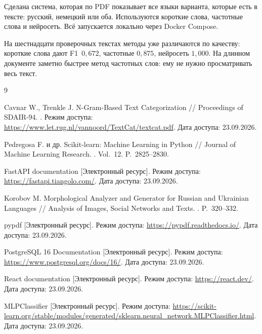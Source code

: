 
Сделана система, которая по PDF показывает все языки варианта, которые есть в тексте: русский, немецкий или оба. Используются короткие слова, частотные слова и нейросеть. Всё запускается локально через Docker Compose.

На шестнадцати проверочных текстах методы уже различаются по качеству: короткие слова дают F1~$0{,}672$, частотные \mdash $0{,}875$, нейросеть \mdash $1{,}000$. На длинном документе заметно быстрее метод частотных слов: ему не нужно просматривать весь текст.

\begin{thebibliography}{9}

	Cavnar W., Trenkle J. N-Gram-Based Text Categorization // Proceedings of SDAIR-94. . \mdash Режим доступа: \url{https://www.let.rug.nl/vannoord/TextCat/textcat.pdf}. \mdash Дата доступа: 23.09.2026.

	Pedregosa F. и др. Scikit-learn: Machine Learning in Python // Journal of Machine Learning Research. . \mdash Vol.~12. \mdash P.~2825--2830.

	FastAPI documentation [Электронный ресурс]. \mdash Режим доступа: \url{https://fastapi.tiangolo.com/}. \mdash Дата доступа: 23.09.2026.

	Korobov M. Morphological Analyzer and Generator for Russian and Ukrainian Languages // Analysis of Images, Social Networks and Texts. . \mdash P.~320--332.

	pypdf [Электронный ресурс]. \mdash Режим доступа: \url{https://pypdf.readthedocs.io/}. \mdash Дата доступа: 23.09.2026.

	PostgreSQL 16 Documentation [Электронный ресурс]. \mdash Режим доступа: \url{https://www.postgresql.org/docs/16/}. \mdash Дата доступа: 23.09.2026.

	React documentation [Электронный ресурс]. \mdash Режим доступа: \url{https://react.dev/}. \mdash Дата доступа: 23.09.2026.

	MLPClassifier [Электронный ресурс]. \mdash Режим доступа: \url{https://scikit-learn.org/stable/modules/generated/sklearn.neural_network.MLPClassifier.html}. \mdash Дата доступа: 23.09.2026.
\end{thebibliography}
